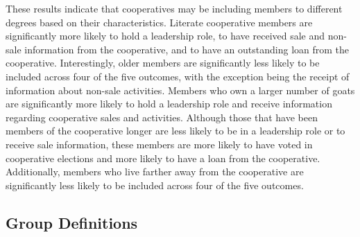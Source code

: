 \documentclass[11pt]{article}
\begin{document}
These results indicate that cooperatives may be including members to different degrees based on their characteristics. Literate cooperative members are significantly more likely to hold a leadership role, to have received sale and non-sale information from the cooperative, and to have an outstanding loan from the cooperative. Interestingly, older members are significantly less likely to be included across four of the five outcomes, with the exception being the receipt of information about non-sale activities. Members who own a larger number of goats are significantly more likely to hold a leadership role and receive information regarding cooperative sales and activities. Although those that have been members of the cooperative longer are less likely to be in a leadership role or to receive sale information, these members are more likely to have voted in cooperative elections and more likely to have a loan from the cooperative. Additionally, members who live farther away from the cooperative are significantly less likely to be included across four of the five outcomes.  


\subsection{Group Definitions}
\end{document}
